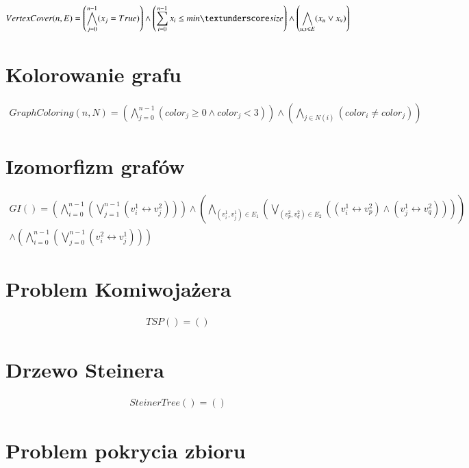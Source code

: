 \begin{align*}
	VertexCover(n, E) = \left( \bigwedge_{j=0}^{n-1} (x_j = True) \right) \land 
	\left( \sum_{i=0}^{n-1} x_i\leq min\textunderscore size \right) \land 
	\left( \bigwedge_{u, v \in E} (x_u \lor x_v) \right)
\end{align*}

\section{Kolorowanie grafu}

\begin{align*}
	GraphColoring(n, N) = \left( \bigwedge_{j=0}^{n-1} (color_j \geq 0 \land color_j < 3) \right) \land 
	\left( \bigwedge_{j \in N(i)} (color_i \neq color_j) \right)
\end{align*}

\section{Izomorfizm grafów}

\begin{align*}
	GI() = \left( \bigwedge_{i=0}^{n-1} \left( \bigvee_{j=1}^{n-1} (v_i^1 \leftrightarrow v_j^2) \right) \right) 
	\land \left( \bigwedge_{(v_i^1, v_j^1) \in E_1} \left( \bigvee_{(v_p^2, v_q^2) \in E_2} ((v_i^1 \leftrightarrow v_p^2) \land (v_j^1 \leftrightarrow v_q^2)) \right) \right) \\
	\land \left( \bigwedge_{i=0}^{n-1} \left( \bigvee_{j=0}^{n-1} (v_i^2 \leftrightarrow v_j^1) \right) \right)	
\end{align*}

\section{Problem Komiwojażera}

\begin{align*}
	TSP() = \left(  \right) 
\end{align*}

\section{Drzewo Steinera}

\begin{align*}
	SteinerTree() = \left(  \right) 
\end{align*}

\section{Problem pokrycia zbioru}

